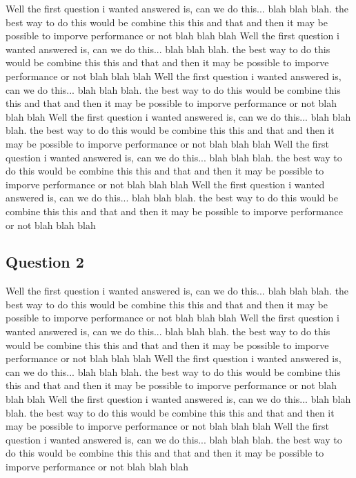 \documentclass{acm_proc_article-sp}
\begin{document}
Well the first question i wanted answered is, can we do this... blah blah blah. the best way to do this would be combine this this and that and then it may be possible to imporve performance or not blah blah blah
Well the first question i wanted answered is, can we do this... blah blah blah. the best way to do this would be combine this this and that and then it may be possible to imporve performance or not blah blah blah
Well the first question i wanted answered is, can we do this... blah blah blah. the best way to do this would be combine this this and that and then it may be possible to imporve performance or not blah blah blah
Well the first question i wanted answered is, can we do this... blah blah blah. the best way to do this would be combine this this and that and then it may be possible to imporve performance or not blah blah blah
Well the first question i wanted answered is, can we do this... blah blah blah. the best way to do this would be combine this this and that and then it may be possible to imporve performance or not blah blah blah
Well the first question i wanted answered is, can we do this... blah blah blah. the best way to do this would be combine this this and that and then it may be possible to imporve performance or not blah blah blah
\subsection{Question 2}
Well the first question i wanted answered is, can we do this... blah blah blah. the best way to do this would be combine this this and that and then it may be possible to imporve performance or not blah blah blah
Well the first question i wanted answered is, can we do this... blah blah blah. the best way to do this would be combine this this and that and then it may be possible to imporve performance or not blah blah blah
Well the first question i wanted answered is, can we do this... blah blah blah. the best way to do this would be combine this this and that and then it may be possible to imporve performance or not blah blah blah
Well the first question i wanted answered is, can we do this... blah blah blah. the best way to do this would be combine this this and that and then it may be possible to imporve performance or not blah blah blah
Well the first question i wanted answered is, can we do this... blah blah blah. the best way to do this would be combine this this and that and then it may be possible to imporve performance or not blah blah blah
\end{document}
